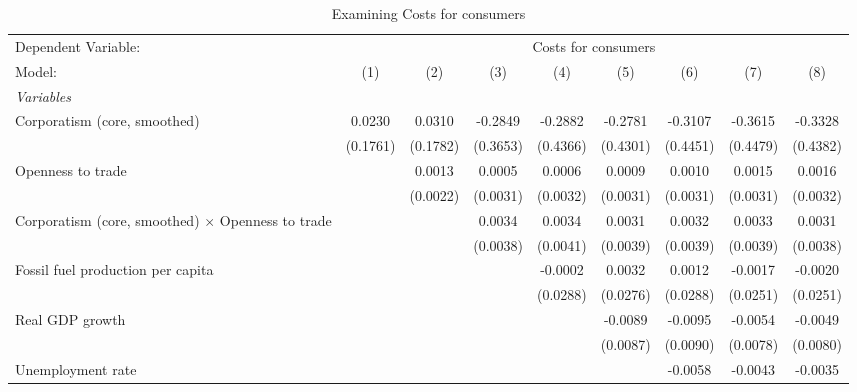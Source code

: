 
\begin{table}[htbp]
   \caption{Examining Costs for consumers}
   \centering
   \begin{tabular}{lcccccccc}
      \tabularnewline \midrule \midrule
      Dependent Variable: & \multicolumn{8}{c}{Costs for consumers}\\
      Model:                                                   & (1)      & (2)      & (3)      & (4)      & (5)      & (6)      & (7)      & (8)\\  
      \midrule
      \emph{Variables}\\
      Corporatism (core, smoothed)                             & 0.0230   & 0.0310   & -0.2849  & -0.2882  & -0.2781  & -0.3107  & -0.3615  & -0.3328\\   
                                                               & (0.1761) & (0.1782) & (0.3653) & (0.4366) & (0.4301) & (0.4451) & (0.4479) & (0.4382)\\   
      Openness to trade                                        &          & 0.0013   & 0.0005   & 0.0006   & 0.0009   & 0.0010   & 0.0015   & 0.0016\\   
                                                               &          & (0.0022) & (0.0031) & (0.0032) & (0.0031) & (0.0031) & (0.0031) & (0.0032)\\   
      Corporatism (core, smoothed) $\times$ Openness to trade  &          &          & 0.0034   & 0.0034   & 0.0031   & 0.0032   & 0.0033   & 0.0031\\   
                                                               &          &          & (0.0038) & (0.0041) & (0.0039) & (0.0039) & (0.0039) & (0.0038)\\   
      Fossil fuel production per capita                        &          &          &          & -0.0002  & 0.0032   & 0.0012   & -0.0017  & -0.0020\\   
                                                               &          &          &          & (0.0288) & (0.0276) & (0.0288) & (0.0251) & (0.0251)\\   
      Real GDP growth                                          &          &          &          &          & -0.0089  & -0.0095  & -0.0054  & -0.0049\\   
                                                               &          &          &          &          & (0.0087) & (0.0090) & (0.0078) & (0.0080)\\   
      Unemployment rate                                        &          &          &          &          &          & -0.0058  & -0.0043  & -0.0035\\   

\end{tabular}
\end{table}
